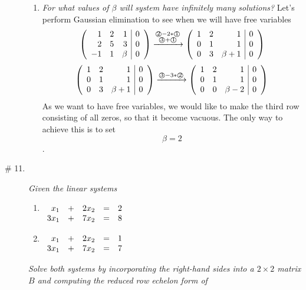 \documentclass[8pt]{article} %
\newcommand{\myexplain}[3]{#1\xrightarrow{\text{#2}}#3}
\newcommand{\myexplainf}[4]{#1\xrightarrow{\begin{subarray}{c}\text{#2}\\\text{#3}\end{subarray}}#4}
\begin{document}
\begin{description}
{\begin{enumerate}[label=(\alph*)]
{			$\beta$, as $x_1=x_2=x_3=0$ will be a solution for it, as can be seen by substitution.
			Therefore, there always be at least one solution.}
		\item{{\it For what values of $\beta$ will system have infinitely many solutions?} Let's perform Gaussian elimination to see
			when we will have free variables
			\[\myexplainf
			{\left(\begin{array}{rrr|r}1&2&1&0\\2&5&3&0\\-1&1&\beta&0\end{array}\right)}
			{\textcircled{2}$-2*$\textcircled{1}}
			{\textcircled{3}$+$\textcircled{1}}
			{\left(\begin{array}{rrr|r}1&2&1&0\\0&1&1&0\\0&3&\beta+1&0\end{array}\right)}
			\]
			\[\myexplain
			{\left(\begin{array}{rrr|r}1&2&1&0\\0&1&1&0\\0&3&\beta+1&0\end{array}\right)}
			{\textcircled{3}$-3*$\textcircled{2}}
			{\left(\begin{array}{rrr|r}1&2&1&0\\0&1&1&0\\0&0&\beta-2&0\end{array}\right)}
			\]
			As we want to have free variables, we would like to make the third row consisting of all zeros, so that it become vacuous.
			The only way to achieve this is to set \[\beta=2\].
			}
	\end{enumerate}
	}
\item[\# 11.]{{\it Given the linear systems}
	\begin{multicols}{2}\begin{enumerate}[label=(\alph*)]
		\item $\begin{array}[t]{rrrrr}
				x_1 & + {} & 2x_2 & = & 2\\
				3x_1 & + {} & 7x_2 & = & 8
			\end{array}$
		\item $\begin{array}[t]{rrrrr}
				x_1 & + {} & 2x_2 & = & 1\\
				3x_1 & + {} & 7x_2 & = & 7
			\end{array}$
	\end{enumerate}\end{multicols}
	{\it Solve both systems by incorporating the right-hand sides into a $2\times 2$ matrix $B$ and computing the reduced row echelon form of}
}
\end{description}
\end{document}
